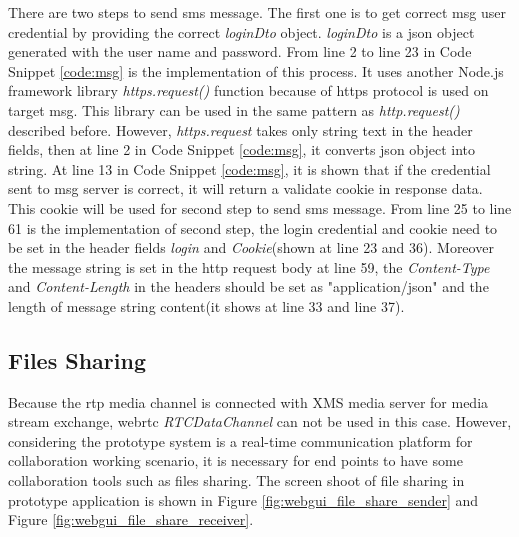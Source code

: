 \par There are two steps to send \gls{sms} message. The first one is to get correct \gls{msg} user credential by providing the correct \textit{loginDto} object. \textit{loginDto} is a \gls{json} object generated with the user name and password. From line 2 to line 23 in Code Snippet \ref{code:msg} is the implementation of this process. It uses another Node.js framework library \textit{https.request()} function because of \gls{https} protocol is used on target \gls{msg}. This library can be used in the same pattern as \textit{http.request()} described before. However, \textit{https.request} takes only string text in the header fields, then at line 2 in Code Snippet \ref{code:msg}, it converts \gls{json} object into string. At line 13 in Code Snippet \ref{code:msg}, it is shown that if the credential sent to \gls{msg} server is correct, it will return a validate cookie in response data. This cookie will be used for second step to send \gls{sms} message. From line 25 to line 61 is the implementation of second step, the login credential and cookie need to be set in the header fields \textit{login} and \textit{Cookie}(shown at line 23 and 36). Moreover the message string is set in the \gls{http} request body at line 59, the \textit{Content-Type} and \textit{Content-Length} in the headers should be set as "application/json" and the length of message string content(it shows at line 33 and line 37).

\subsection{Files Sharing}

\par Because the \gls{rtp} media channel is connected with XMS media server for media  stream exchange, \gls{webrtc} \textit{RTCDataChannel} can not be used in this case. However, considering the prototype system is a real-time communication platform for collaboration working scenario, it is necessary for end points to have some collaboration tools such as files sharing. The screen shoot of file sharing in prototype application is shown in Figure \ref{fig:webgui_file_share_sender} and Figure \ref{fig:webgui_file_share_receiver}.

